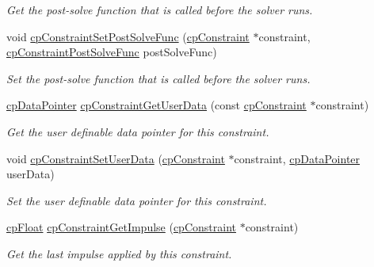 \begin{DoxyCompactItemize}
\begin{DoxyCompactList}\small\item\em Get the post-\/solve function that is called before the solver runs. \end{DoxyCompactList}\item 
\hypertarget{group__cp_constraint_gae9d257bb382593a5bd7d2ebd8e54e1c6}{}void \hyperlink{group__cp_constraint_gae9d257bb382593a5bd7d2ebd8e54e1c6}{cp\+Constraint\+Set\+Post\+Solve\+Func} (\hyperlink{structcp_constraint}{cp\+Constraint} $\ast$constraint, \hyperlink{group__cp_constraint_ga2208378297a7265d0cc69f31697961b9}{cp\+Constraint\+Post\+Solve\+Func} post\+Solve\+Func)\label{group__cp_constraint_gae9d257bb382593a5bd7d2ebd8e54e1c6}

\begin{DoxyCompactList}\small\item\em Set the post-\/solve function that is called before the solver runs. \end{DoxyCompactList}\item 
\hypertarget{group__cp_constraint_ga2474d191d371fa669203139d564956c9}{}\hyperlink{group__basic_types_ga2ac2c3c31e21893941f9e4f8ee279447}{cp\+Data\+Pointer} \hyperlink{group__cp_constraint_ga2474d191d371fa669203139d564956c9}{cp\+Constraint\+Get\+User\+Data} (const \hyperlink{structcp_constraint}{cp\+Constraint} $\ast$constraint)\label{group__cp_constraint_ga2474d191d371fa669203139d564956c9}

\begin{DoxyCompactList}\small\item\em Get the user definable data pointer for this constraint. \end{DoxyCompactList}\item 
\hypertarget{group__cp_constraint_ga9603ffac8ef73c7976e473af1b035d5f}{}void \hyperlink{group__cp_constraint_ga9603ffac8ef73c7976e473af1b035d5f}{cp\+Constraint\+Set\+User\+Data} (\hyperlink{structcp_constraint}{cp\+Constraint} $\ast$constraint, \hyperlink{group__basic_types_ga2ac2c3c31e21893941f9e4f8ee279447}{cp\+Data\+Pointer} user\+Data)\label{group__cp_constraint_ga9603ffac8ef73c7976e473af1b035d5f}

\begin{DoxyCompactList}\small\item\em Set the user definable data pointer for this constraint. \end{DoxyCompactList}\item 
\hypertarget{group__cp_constraint_gaef688fa4ccd8c90d3364cccd776b8e20}{}\hyperlink{group__basic_types_gac1ed65573e035bf892505768c852d8d3}{cp\+Float} \hyperlink{group__cp_constraint_gaef688fa4ccd8c90d3364cccd776b8e20}{cp\+Constraint\+Get\+Impulse} (\hyperlink{structcp_constraint}{cp\+Constraint} $\ast$constraint)\label{group__cp_constraint_gaef688fa4ccd8c90d3364cccd776b8e20}

\begin{DoxyCompactList}\small\item\em Get the last impulse applied by this constraint. \end{DoxyCompactList}\end{DoxyCompactItemize}


